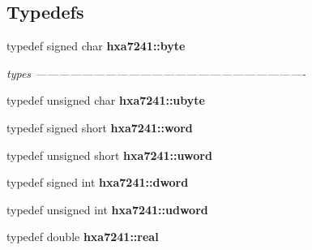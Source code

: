 \subsection*{Typedefs}
\begin{CompactItemize}
\item 
typedef signed char {\bf hxa7241::byte}
\begin{CompactList}\small\item\em types ---------------------------------------------------------------------- \item\end{CompactList}\item 
typedef unsigned char {\bf hxa7241::ubyte}
\item 
typedef signed short {\bf hxa7241::word}
\item 
typedef unsigned short {\bf hxa7241::uword}
\item 
typedef signed int {\bf hxa7241::dword}
\item 
typedef unsigned int {\bf hxa7241::udword}
\item 
typedef double {\bf hxa7241::real}
\end{CompactItemize}
